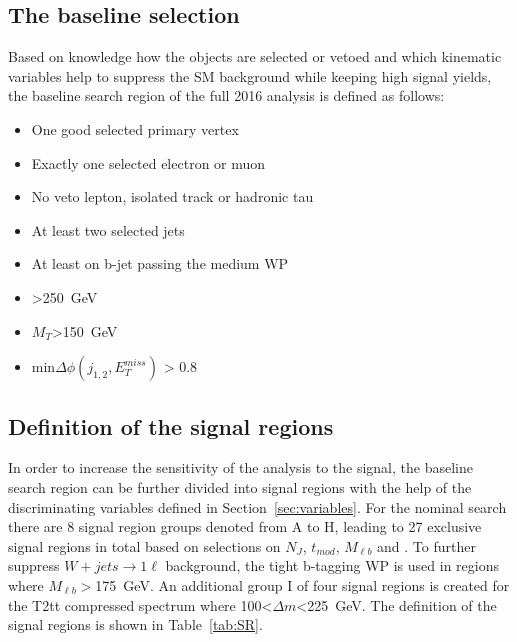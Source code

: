 



\subsection{The baseline selection~\label{sec:baseline}}

Based on knowledge how the objects are selected or vetoed and  which kinematic variables help to suppress the SM background while keeping high signal yields, the baseline search region of the full 2016 analysis is defined as follows:

\begin{itemize}
\item One good selected primary vertex
\item Exactly one selected electron or muon
\item No veto lepton, isolated track or hadronic tau
\item At least two selected jets
\item At least on b-jet passing the medium WP 
\item \MET>250~GeV
\item $M_{T}$>150~GeV
\item min$\Delta \phi (j_{1,2}, E_{T}^{miss})$ > 0.8
\end{itemize}


\subsection{Definition of the signal regions~\label{sec:sr}}

In order to increase the sensitivity of the analysis to the signal, the baseline search region can be further divided into signal regions with the help of the discriminating variables defined in Section~\ref{sec:variables}. For the nominal search there are 8 signal region groups denoted from A to H, leading to 27 exclusive signal regions in total based on selections on $N_{J}$, $t_{mod}$, $M_{\ell b}$ and \MET. To further suppress $W+jets \to 1\ell$ background, the tight b-tagging WP is used in regions where $M_{\ell b}>$175~GeV.  An additional group I of four signal regions is created for the T2tt compressed spectrum where 100<$\Delta m$<225~GeV. The definition of the signal regions is shown in Table~\ref{tab:SR}.


